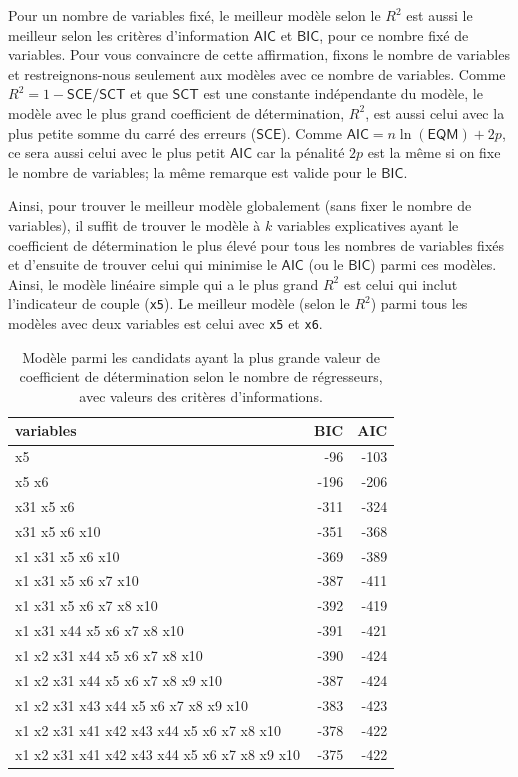 \documentclass[
  11pt,
  letterpaper,
]{scrbook}
\theoremstyle{definition}
\theoremstyle{remark}
\begin{document}
Pour un nombre de variables fixé, le meilleur modèle selon le \(R^2\)
est aussi le meilleur selon les critères d'information \(\mathsf{AIC}\)
et \(\mathsf{BIC}\), pour ce nombre fixé de variables. Pour vous
convaincre de cette affirmation, fixons le nombre de variables et
restreignons-nous seulement aux modèles avec ce nombre de variables.
Comme \(R^2=1 - \mathsf{SCE}/\mathsf{SCT}\) et que \(\mathsf{SCT}\) est
une constante indépendante du modèle, le modèle avec le plus grand
coefficient de détermination, \(R^2\), est aussi celui avec la plus
petite somme du carré des erreurs (\(\mathsf{SCE}\)). Comme
\(\mathsf{AIC}=n \ln (\mathsf{EQM}) + 2p\), ce sera aussi celui avec le
plus petit \(\mathsf{AIC}\) car la pénalité \(2p\) est la même si on
fixe le nombre de variables; la même remarque est valide pour le
\(\mathsf{BIC}\).

Ainsi, pour trouver le meilleur modèle globalement (sans fixer le nombre
de variables), il suffit de trouver le modèle à \(k\) variables
explicatives ayant le coefficient de détermination le plus élevé pour
tous les nombres de variables fixés et d'ensuite de trouver celui qui
minimise le \(\mathsf{AIC}\) (ou le \(\mathsf{BIC}\)) parmi ces modèles.
Ainsi, le modèle linéaire simple qui a le plus grand \(R^2\) est celui
qui inclut l'indicateur de couple (\texttt{x5}). Le meilleur modèle
(selon le \(R^2\)) parmi tous les modèles avec deux variables est celui
avec \texttt{x5} et \texttt{x6}.

\hypertarget{tbl-leaps-simple}{}
\begin{table}
\caption{\label{tbl-leaps-simple}Modèle parmi les candidats ayant la plus grande valeur de coefficient de
détermination selon le nombre de régresseurs, avec valeurs des critères
d'informations. }\tabularnewline

\centering
\begin{tabular}{lrr}
\toprule
variables & BIC & AIC\\
\midrule
x5 & -96 & -103\\
x5 x6 & -196 & -206\\
x31 x5 x6 & -311 & -324\\
x31 x5 x6 x10 & -351 & -368\\
x1 x31 x5 x6 x10 & -369 & -389\\
\addlinespace
x1 x31 x5 x6 x7 x10 & -387 & -411\\
x1 x31 x5 x6 x7 x8 x10 & -392 & -419\\
x1 x31 x44 x5 x6 x7 x8 x10 & -391 & -421\\
x1 x2 x31 x44 x5 x6 x7 x8 x10 & -390 & -424\\
x1 x2 x31 x44 x5 x6 x7 x8 x9 x10 & -387 & -424\\
\addlinespace
x1 x2 x31 x43 x44 x5 x6 x7 x8 x9 x10 & -383 & -423\\
x1 x2 x31 x41 x42 x43 x44 x5 x6 x7 x8 x10 & -378 & -422\\
x1 x2 x31 x41 x42 x43 x44 x5 x6 x7 x8 x9 x10 & -375 & -422\\
\bottomrule
\end{tabular}
\end{table}
\end{document}
